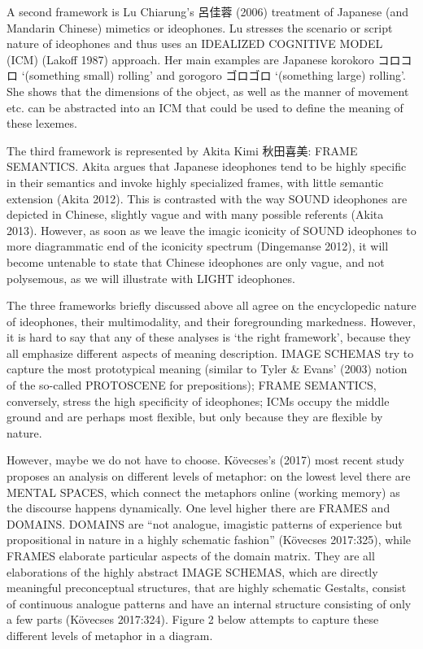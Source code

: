 A second framework is Lu Chiarung's 呂佳蓉 (2006) treatment of Japanese
(and Mandarin Chinese) mimetics or ideophones. Lu stresses the scenario
or script nature of ideophones and thus uses an IDEALIZED COGNITIVE
MODEL (ICM) (Lakoff 1987) approach. Her main examples are Japanese
korokoro コロコロ `(something small) rolling' and gorogoro ゴロゴロ
`(something large) rolling'. She shows that the dimensions of the
object, as well as the manner of movement etc. can be abstracted into an
ICM that could be used to define the meaning of these lexemes.

The third framework is represented by Akita Kimi 秋田喜美: FRAME
SEMANTICS. Akita argues that Japanese ideophones tend to be highly
specific in their semantics and invoke highly specialized frames, with
little semantic extension (Akita 2012). This is contrasted with the way
SOUND ideophones are depicted in Chinese, slightly vague and with many
possible referents (Akita 2013). However, as soon as we leave the imagic
iconicity of SOUND ideophones to more diagrammatic end of the iconicity
spectrum (Dingemanse 2012), it will become untenable to state that
Chinese ideophones are only vague, and not polysemous, as we will
illustrate with LIGHT ideophones.

The three frameworks briefly discussed above all agree on the
encyclopedic nature of ideophones, their multimodality, and their
foregrounding markedness. However, it is hard to say that any of these
analyses is `the right framework', because they all emphasize different
aspects of meaning description. IMAGE SCHEMAS try to capture the most
prototypical meaning (similar to Tyler \& Evans' (2003) notion of the
so-called PROTOSCENE for prepositions); FRAME SEMANTICS, conversely,
stress the high specificity of ideophones; ICMs occupy the middle ground
and are perhaps most flexible, but only because they are flexible by
nature.

However, maybe we do not have to choose. Kövecses's (2017) most recent
study proposes an analysis on different levels of metaphor: on the
lowest level there are MENTAL SPACES, which connect the metaphors online
(working memory) as the discourse happens dynamically. One level higher
there are FRAMES and DOMAINS. DOMAINS are ``not analogue, imagistic
patterns of experience but propositional in nature in a highly schematic
fashion'' (Kövecses 2017:325), while FRAMES elaborate particular aspects
of the domain matrix. They are all elaborations of the highly abstract
IMAGE SCHEMAS, which are directly meaningful preconceptual structures,
that are highly schematic Gestalts, consist of continuous analogue
patterns and have an internal structure consisting of only a few parts
(Kövecses 2017:324). Figure 2 below attempts to capture these different
levels of metaphor in a diagram.

